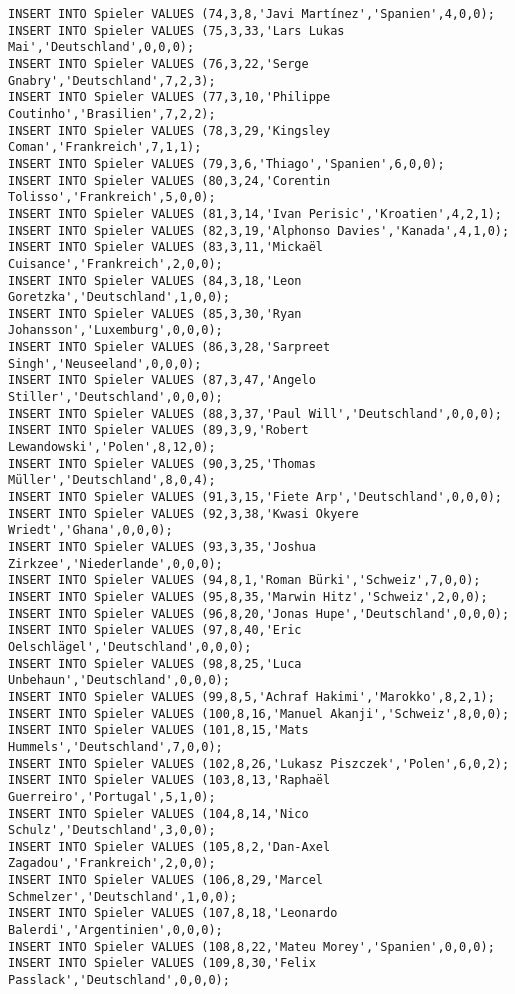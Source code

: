 \documentclass{bschlangaul-aufgabe}
\begin{document}
\begin{verbatim}
INSERT INTO Spieler VALUES (74,3,8,'Javi Martínez','Spanien',4,0,0);
INSERT INTO Spieler VALUES (75,3,33,'Lars Lukas Mai','Deutschland',0,0,0);
INSERT INTO Spieler VALUES (76,3,22,'Serge Gnabry','Deutschland',7,2,3);
INSERT INTO Spieler VALUES (77,3,10,'Philippe Coutinho','Brasilien',7,2,2);
INSERT INTO Spieler VALUES (78,3,29,'Kingsley Coman','Frankreich',7,1,1);
INSERT INTO Spieler VALUES (79,3,6,'Thiago','Spanien',6,0,0);
INSERT INTO Spieler VALUES (80,3,24,'Corentin Tolisso','Frankreich',5,0,0);
INSERT INTO Spieler VALUES (81,3,14,'Ivan Perisic','Kroatien',4,2,1);
INSERT INTO Spieler VALUES (82,3,19,'Alphonso Davies','Kanada',4,1,0);
INSERT INTO Spieler VALUES (83,3,11,'Mickaël Cuisance','Frankreich',2,0,0);
INSERT INTO Spieler VALUES (84,3,18,'Leon Goretzka','Deutschland',1,0,0);
INSERT INTO Spieler VALUES (85,3,30,'Ryan Johansson','Luxemburg',0,0,0);
INSERT INTO Spieler VALUES (86,3,28,'Sarpreet Singh','Neuseeland',0,0,0);
INSERT INTO Spieler VALUES (87,3,47,'Angelo Stiller','Deutschland',0,0,0);
INSERT INTO Spieler VALUES (88,3,37,'Paul Will','Deutschland',0,0,0);
INSERT INTO Spieler VALUES (89,3,9,'Robert Lewandowski','Polen',8,12,0);
INSERT INTO Spieler VALUES (90,3,25,'Thomas Müller','Deutschland',8,0,4);
INSERT INTO Spieler VALUES (91,3,15,'Fiete Arp','Deutschland',0,0,0);
INSERT INTO Spieler VALUES (92,3,38,'Kwasi Okyere Wriedt','Ghana',0,0,0);
INSERT INTO Spieler VALUES (93,3,35,'Joshua Zirkzee','Niederlande',0,0,0);
INSERT INTO Spieler VALUES (94,8,1,'Roman Bürki','Schweiz',7,0,0);
INSERT INTO Spieler VALUES (95,8,35,'Marwin Hitz','Schweiz',2,0,0);
INSERT INTO Spieler VALUES (96,8,20,'Jonas Hupe','Deutschland',0,0,0);
INSERT INTO Spieler VALUES (97,8,40,'Eric Oelschlägel','Deutschland',0,0,0);
INSERT INTO Spieler VALUES (98,8,25,'Luca Unbehaun','Deutschland',0,0,0);
INSERT INTO Spieler VALUES (99,8,5,'Achraf Hakimi','Marokko',8,2,1);
INSERT INTO Spieler VALUES (100,8,16,'Manuel Akanji','Schweiz',8,0,0);
INSERT INTO Spieler VALUES (101,8,15,'Mats Hummels','Deutschland',7,0,0);
INSERT INTO Spieler VALUES (102,8,26,'Lukasz Piszczek','Polen',6,0,2);
INSERT INTO Spieler VALUES (103,8,13,'Raphaël Guerreiro','Portugal',5,1,0);
INSERT INTO Spieler VALUES (104,8,14,'Nico Schulz','Deutschland',3,0,0);
INSERT INTO Spieler VALUES (105,8,2,'Dan-Axel Zagadou','Frankreich',2,0,0);
INSERT INTO Spieler VALUES (106,8,29,'Marcel Schmelzer','Deutschland',1,0,0);
INSERT INTO Spieler VALUES (107,8,18,'Leonardo Balerdi','Argentinien',0,0,0);
INSERT INTO Spieler VALUES (108,8,22,'Mateu Morey','Spanien',0,0,0);
INSERT INTO Spieler VALUES (109,8,30,'Felix Passlack','Deutschland',0,0,0);

\end{verbatim}
\end{document}
